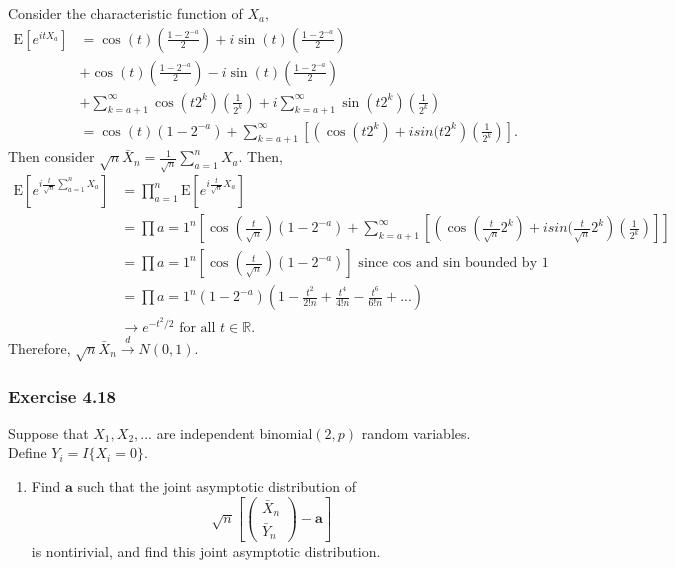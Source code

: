 \documentclass[12pt,]{article}
\providecommand{\tightlist}{%
  \setlength{\itemsep}{0pt}\setlength{\parskip}{0pt}}
\begin{document}
Consider the characteristic function of \(X_a,\) \begin{align*}
\text{E}\left[e^{itX_a}\right] & = \cos(t)\left(\frac{1-2^{-a}}{2}\right) + i\sin(t)\left(\frac{1-2^{-a}}{2}\right)\\
& + \cos(t)\left(\frac{1-2^{-a}}{2}\right)-i\sin(t)\left(\frac{1-2^{-a}}{2}\right)\\
& +\sum_{k=a+1}^\infty \cos(t2^k)\left(\frac{1}{2^k}\right) + i\sum_{k=a+1}^\infty \sin(t2^k)\left(\frac{1}{2^k}\right)\\
& = \cos(t)(1-2^{-a})+\sum_{k=a+1}^\infty\left[\left(\cos(t2^k)+isin(t2^k\right)\left(\frac{1}{2^k}\right)\right].
\end{align*} Then consider
\(\sqrt{n}\bar X_n=\frac{1}{\sqrt{n}}\sum_{a=1}^nX_a.\) Then,
\begin{align*}
\text{E}\left[e^{i\frac{t}{\sqrt{n}}\sum_{a=1}^nX_a}\right] & = \prod_{a=1}^n \text{E}\left[e^{i\frac{t}{\sqrt{n}}X_a}\right]\\
& = \prod{a=1}^n\left[\cos(\frac{t}{\sqrt{n}})(1-2^{-a})+\sum_{k=a+1}^\infty\left[\left(\cos(\frac{t}{\sqrt{n}}2^k)+isin(\frac{t}{\sqrt{n}}2^k\right)\left(\frac{1}{2^k}\right)\right]\right]\\
& = \prod{a=1}^n\left[\cos(\frac{t}{\sqrt{n}})(1-2^{-a})\right] \text{ since cos and sin bounded by 1}\\
& = \prod{a=1}^n (1-2^{-a})(1-\frac{t^2}{2!n}+\frac{t^4}{4!n}-\frac{t^6}{6!n}+...)\\
& \rightarrow e^{-t^2/2} \text{ for all } t\in \mathbb{R}.
\end{align*} Therefore,
\(\sqrt{n}\bar X_n \overset{d}\rightarrow N(0,1)\).

\hypertarget{exercise-4.18}{%
\subsubsection{Exercise 4.18}\label{exercise-4.18}}

Suppose that \(X_1, X_2,...\) are independent binomial\((2,p)\) random
variables. Define \(Y_i=I\{X_i=0\}.\)

\begin{enumerate}
\def\labelenumi{(\alph{enumi})}
\tightlist
\item
  Find \(\boldsymbol a\) such that the joint asymptotic distribution of
  \[\sqrt{n}\left[ \begin{pmatrix} \bar X_n \\ \bar Y_n \end{pmatrix} -\boldsymbol a\right]\]
  is nontirivial, and find this joint asymptotic distribution.
\end{enumerate}
\end{document}

